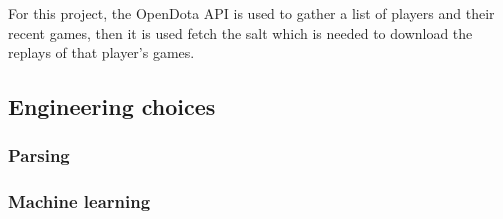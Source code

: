 \documentclass[Report.tex]{subfiles}
\begin{document}
For this project, the OpenDota API is used to gather a list of players and their recent games, then it is used fetch the salt which is needed to download the replays of that player's games. 


\subsection{Engineering choices}

\subsubsection{Parsing}

\subsubsection{Machine learning}
\end{document}
